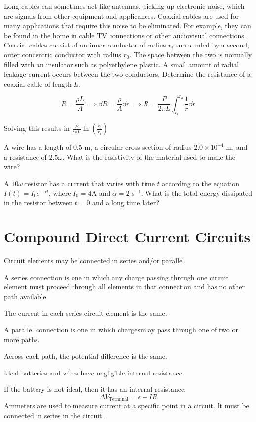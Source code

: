 \documentclass[../em.tex]{subfiles}
\begin{document}
\begin{example}
    Long cables can sometimes act like antennas, picking up electronic noise, which are signals from other equipment and applicances. Coaxial cables are used for many applications 
    that require this noise to be eliminated. For example, they can be found in the home in cable TV connections or other audiovisual connections. Coaxial cables consist of an inner conductor 
    of radius $r_i$ surrounded by a second, outer concentric conductor with radius $r_0$. The space between the two is normally filled with an insulator such as polyethylene plastic.
    A small amount of radial leakage current occurs between the two conductors. Determine the resistance of a coaxial cable of length $L$.

    \[ R=\frac{\rho L}{A}\implies \dd R = \frac{\rho}{A}\dd r \implies R = \frac{P}{2\pi L}\int_{r_i}^{r_o}\frac{1}{r}\dd r \]

    Solving this results in $\frac{P}{2\pi L}\ln\left(\frac{r_0}{r_i}\right)$
\end{example}

\ex A wire has a length of 0.5 m, a circular cross section of radius $2.0\times 10^{-4}$ m, and a resistance of $2.5\omega$. What is the resistivity of the material used to make the wire?

\ex A $10\omega$ resistor has a current that varies with time $t$ according to the equation $I(t)=I_0e^{-\alpha t}$, where $I_0 = 4$A and $\alpha = 2$ s$^{-1}$. What is the total energy dissipated in the resistor between $t=0$ and a long time later?

\section{Compound Direct Current Circuits}
Circuit elements may be connected in series and/or parallel.

A series connection is one in which any charge passing through one circuit element must proceed through all elements in that connection and has no other path available.

The current in each series circuit element is the same.

A parallel connection is one in which chargesm ay pass through one of two or more paths.

Across each path, the potential difference is the same.

Ideal batteries and wires have negligible internal resistance.

If the battery is not ideal, then it has an internal resistance.
\[\Delta V_{\text{Terminal}}=\epsilon - IR \]
Ammeters are used to measure current at a specific point in a circuit. It must be connected in series in the circuit.
\end{document}
